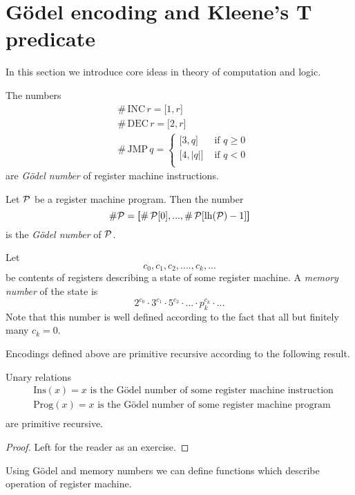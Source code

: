 \documentclass[10pt]{amsart}
\begin{document}
\section{G{\"o}del encoding and Kleene's T predicate}
\noindent
In this section we introduce core ideas in theory of computation and logic.

\begin{definition}
	The numbers
	\begin{align*}
		 & \#\,\mathrm{INC}\,r = \textbf{[}1, r\textbf{]}                         \\
		 & \#\,\mathrm{DEC}\,r = \textbf{[}2, r\textbf{]}                         \\
		 & \#\,\mathrm{JMP}\,q = \begin{cases}
			                         \textbf{[}3, q\textbf{]}   & \mbox{ if }q \geq 0 \\
			                         \textbf{[}4, |q|\textbf{]} & \mbox{ if }q < 0    \\
		                         \end{cases}
	\end{align*}
	are \textit{G{\"o}del number} of register machine instructions.
\end{definition}

\begin{definition}
	Let ${\mathcal P}$ be a register machine program. Then the number
	$$\#{\mathcal P} = \textbf{[}\#\,{\mathcal P}[0],...,\#\,{\mathcal P}[\mathrm{lh}({\mathcal P}) - 1]\textbf{]}$$
	is the \textit{G{\"o}del number} of ${\mathcal P}$.
\end{definition}

\begin{definition}
	Let
	$$c_0,c_1,c_2,....,c_k,...$$
	be contents of registers describing a state of some register machine. A \textit{memory number} of the state is
	$$2^{c_0}\cdot 3^{c_1}\cdot 5^{c_2}\cdot ...\cdot p_{k}^{c_{k}}\cdot ...$$
	Note that this number is well defined according to the fact that all but finitely many $c_k = 0$.
\end{definition}
\noindent
Encodings defined above are primitive recursive according to the following result.

\begin{fact}\label{fact:godel_encodings_are_primitive_recursive}
	Unary relations
	\begin{align*}
		 & \mathrm{Ins}(x) = x\mbox{ is the G{\"o}del number of some register machine instruction} \\
		 & \mathrm{Prog}(x) = x\mbox{ is the G{\"o}del number of some register machine program}    \\
	\end{align*}
	are primitive recursive.
\end{fact}
\begin{proof}
	Left for the reader as an exercise.
\end{proof}
\noindent
Using G{\"o}del and memory numbers we can define functions which describe operation of register machine.
\end{document}
